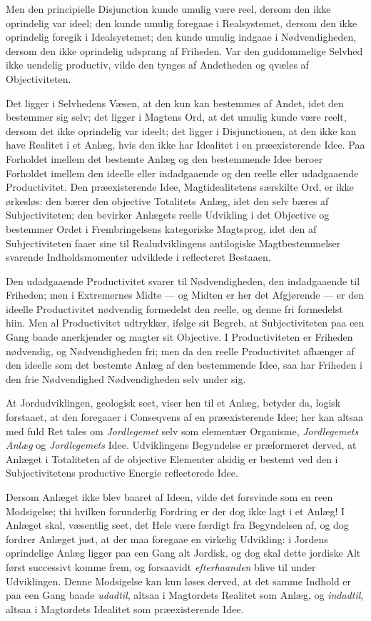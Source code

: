 \documentclass[12pt]{book}
\newcommand{\opage}[1]{\marginnote{\footnotesize\textit{[#1]}}}
\begin{document}
Men den principielle Disjunction kunde umulig være reel, dersom den ikke oprindelig var ideel; den kunde umulig foregaae i Realsystemet, dersom den ikke oprindelig foregik i Idealsystemet; den kunde umulig indgaae i Nødvendigheden, dersom den ikke oprindelig udsprang af Friheden. Var den guddommelige Selvhed ikke uendelig productiv, vilde den tynges af Andetheden og qvæles af Objectiviteten.

\opage{444}Det ligger i Selvhedens Væsen, at den kun kan bestemmes af Andet, idet den bestemmer sig selv; det ligger i Magtens Ord, at det umulig kunde være reelt, dersom det ikke oprindelig var ideelt; det ligger i Disjunctionen, at den ikke kan have Realitet i et Anlæg, hvis den ikke har Idealitet i en præexisterende Idee. Paa Forholdet imellem det bestemte Anlæg og den bestemmende Idee beroer Forholdet imellem den ideelle eller indadgaaende og den reelle eller udadgaaende Productivitet. Den præexisterende Idee, Magtidealitetens særskilte Ord, er ikke ørkesløs: den bærer den objective Totalitets Anlæg, idet den selv bæres af Subjectiviteten; den bevirker Anlægets reelle Udvikling i det Objective og bestemmer Ordet i Frembringelsens kategoriske Magtsprog, idet den af Subjectiviteten faaer sine til Realudviklingens antilogiske Magtbestemmelser svarende Indholdsmomenter udviklede i reflecteret Bestaaen.

Den udadgaaende Productivitet svarer til Nødvendigheden, den indadgaaende til Friheden; men i Extremernes Midte --- og Midten er her det Afgjørende --- er den ideelle Productivitet nødvendig formedelst den reelle, og denne fri formedelst hiin. Men al Productivitet udtrykker, ifølge sit Begreb, at Subjectiviteten paa een Gang baade anerkjender og magter sit Objective. I Productiviteten er Friheden nødvendig, og Nødvendigheden fri; men da den reelle Productivitet afhænger af den ideelle som det bestemte Anlæg af den bestemmende Idee, saa har Friheden i den frie Nødvendighed Nødvendigheden selv under sig.

At Jordudviklingen, geologisk seet, viser hen til et Anlæg, betyder da, logisk forstaaet, at den foregaaer i Conseqvens af en præexisterende Idee; her kan altsaa med fuld Ret tales om \emph{Jordlegemet} selv som elementær Organisme, \emph{Jordlegemets Anlæg} og \emph{Jordlegemets} Idee. Udviklingens Begyndelse er præformeret derved, at Anlæget i Totaliteten af de objective Elementer alsidig er bestemt ved den i Subjectivitetens productive Energie reflecterede Idee.

\opage{445}Dersom Anlæget ikke blev baaret af Ideen, vilde det forsvinde som en reen Modsigelse; thi hvilken forunderlig Fordring er der dog ikke lagt i et Anlæg! I Anlæget skal, væsentlig seet, det Hele være færdigt fra Begyndelsen af, og dog fordrer Anlæget just, at der maa foregaae en virkelig Udvikling: i Jordens oprindelige Anlæg ligger paa een Gang alt Jordisk, og dog skal dette jordiske Alt først successivt komme frem, og forsaavidt \emph{efterhaanden} blive til under Udviklingen. Denne Modsigelse kan kun løses derved, at det samme Indhold er paa een Gang baade \emph{udadtil}, altsaa i Magtordets Realitet som Anlæg, og \emph{indadtil}, altsaa i Magtordets Idealitet som præexisterende Idee.
\end{document}
